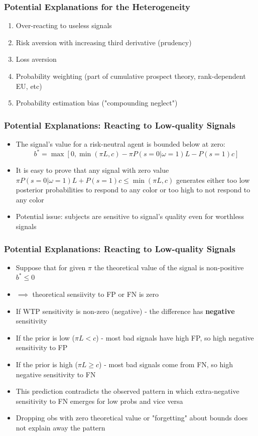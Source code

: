 \documentclass[11pt,hyperref={bookmarks=false}]{beamer}
\begin{document}
\begin{frame}
\begin{figure}[h]
\begin{subfigure}{0.5\textwidth}
\end{subfigure}
\end{figure}
\end{frame}



\begin{frame}
\frametitle{Potential Explanations for the Heterogeneity}
\begin{enumerate}
\item Over-reacting to useless signals
\item Risk aversion with increasing third derivative (prudency)
\item Loss aversion
\item Probability weighting (part of cumulative prospect theory, rank-dependent EU, etc)
\item Probability estimation bias ("compounding neglect")
\end{enumerate}
\end{frame}


\begin{frame}
\frametitle{Potential Explanations: Reacting to Low-quality Signals}
\begin{itemize}
\item The signal's value for a risk-neutral agent is bounded below at zero: 
$$b^*=\max[0,\min(\pi L, c)-\pi P(s=0|\omega=1)L-P(s=1)c]$$
\item It is easy to prove that any signal with zero value $\pi P(s=0|\omega=1)L+P(s=1)c\leq \min(\pi L, c)$ generates either too low posterior probabilities to respond to any color or too high to not respond to any color
\item Potential issue: subjects are sensitive to signal's quality even for worthless signals
\end{itemize}
\end{frame}


\begin{frame}
\frametitle{Potential Explanations: Reacting to Low-quality Signals}
\begin{itemize}
\item Suppose that for given $\pi$ the theoretical value of the signal is non-positive $b^*\leq 0$
\item $\implies$ theoretical sensiivity to FP or FN is zero
\item If WTP sensitivity is non-zero (negative) - the difference has \textbf{negative} sensitivity
\item If the prior is low ($\pi L<c$) - most bad signals have high FP, so high negative sensitivity to FP
\item If the prior is high ($\pi L\geq c$) - most bad signals come from FN, so high negative sensitivity to FN
\item This prediction contradicts the observed pattern in which extra-negative sensitivity to FN emerges for low probs and vice versa 
\item Dropping obs with zero theoretical value or "forgetting" about bounds does not explain away the pattern
\end{itemize}
\end{frame}
\end{document}
